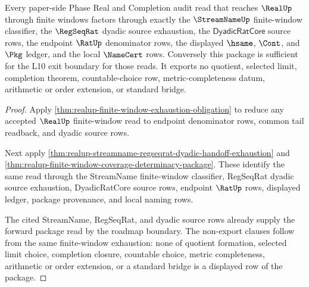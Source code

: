\begin{theorem}
\label{thm:realup-open-phase-audit-boundary}
Every paper-side Phase Real and Completion audit read that reaches
$\RealUp$ through finite windows factors through exactly the
$\StreamNameUp$ finite-window classifier, the $\RegSeqRat$ dyadic source
exhaustion, the $\mathsf{DyadicRatCore}$ source rows, the endpoint $\RatUp$
denominator rows, the displayed $\hsame$, $\Cont$, and $\Pkg$ ledger, and
the local $\NameCert$ rows. Conversely this package is sufficient for the
L10 exit boundary for those reads. It exports no quotient, selected limit,
completion theorem, countable-choice row, metric-completeness datum,
arithmetic or order extension, or standard bridge.
\end{theorem}
\begin{proof}
Apply \autoref{thm:realup-finite-window-exhaustion-obligation} to reduce any
accepted $\RealUp$ finite-window read to endpoint denominator rows, common
tail readback, and dyadic source rows.

Next apply \autoref{thm:realup-streamname-regseqrat-dyadic-handoff-exhaustion}
and \autoref{thm:realup-finite-window-coverage-determinacy-package}. These
identify the same read through the StreamName finite-window classifier,
RegSeqRat dyadic source exhaustion, DyadicRatCore source rows, endpoint
$\RatUp$ rows, displayed ledger, package provenance, and local naming rows.

The cited StreamName, RegSeqRat, and dyadic source rows already supply the
forward package read by the roadmap boundary. The non-export clauses follow
from the same finite-window exhaustion: none of quotient formation, selected
limit choice, completion closure, countable choice, metric completeness,
arithmetic or order extension, or a standard bridge is a displayed row of
the package.
\end{proof}

